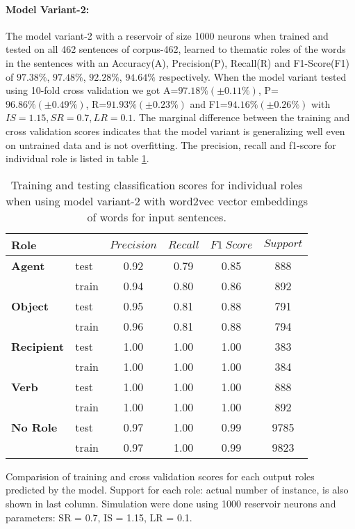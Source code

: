 \paragraph{Model Variant-2:} The model variant-2 with a reservoir of size 1000 neurons when trained and tested on all 462 sentences of corpus-462, learned to thematic roles of the words in the sentences with an Accuracy(A), Precision(P), Recall(R) and F1-Score(F1) of $97.38\%$,  $97.48\%$, $92.28\%$, $94.64\%$ respectively. When the model variant tested using 10-fold cross validation we got A=$97.18\% (\pm 0.11\%)$, P= $96.86\%(\pm 0.49\%)$, R=$91.93\%(\pm 0.23\%)$ and F1=$94.16\%(\pm 0.26\%)$ with $IS=1.15, SR=0.7, LR=0.1$. The marginal difference between the training and cross validation scores indicates that the model variant is generalizing well even on untrained data and is not overfitting. The precision, recall and f1-score for individual role is listed in table \ref{tab:classsification-scores-21}. 

\begin{table}
\centering
\begin{threeparttable}
\caption{Training and testing classification scores for individual roles when using model variant-2 with word2vec vector embeddings of words for input sentences.}
\label{tab:classsification-scores-21}
\begin{tabular}{llcccc}
\toprule
Role & & \( Precision \) & \( Recall \) & \( F1 \ Score \) & \( Support \) \\
\midrule                 
\textbf{Agent}		&test 	& 0.92 & 0.79 & 0.85 & 888 \\
					& train & 0.94 & 0.80 & 0.86 & 892 \\
\textbf{Object}		&test 	& 0.95 & 0.81 & 0.88 & 791 \\
					& train & 0.96 & 0.81 & 0.88 & 794 \\
\textbf{Recipient}	&test 	& 1.00 & 1.00 & 1.00 & 383 \\
					& train & 1.00 & 1.00 & 1.00 & 384 \\
\textbf{Verb}		&test	& 1.00 & 1.00 & 1.00 & 888 \\
					& train & 1.00 & 1.00 & 1.00 & 892 \\
\textbf{No Role}	& test 	& 0.97 & 1.00 & 0.99 & 9785 \\
					& train & 0.97 & 1.00 & 0.99 & 9823 \\
\bottomrule
\end{tabular}
\begin{tablenotes}
\small
\item Comparision of training and cross validation scores for each output roles predicted by the model. Support for each role: actual number of instance, is also shown in last column. Simulation were done using 1000 reservoir neurons and parameters: SR = 0.7, IS = 1.15, LR = 0.1.
\end{tablenotes}
\end{threeparttable}
\end{table}


